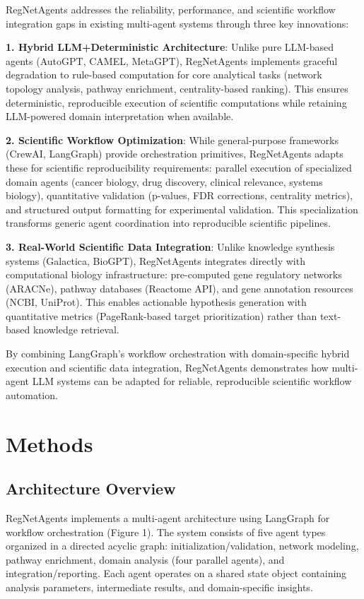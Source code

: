 \documentclass[11pt]{article}
\begin{document}
RegNetAgents addresses the reliability, performance, and scientific workflow integration gaps in existing multi-agent systems through three key innovations:

\textbf{1. Hybrid LLM+Deterministic Architecture}: Unlike pure LLM-based agents (AutoGPT, CAMEL, MetaGPT), RegNetAgents implements graceful degradation to rule-based computation for core analytical tasks (network topology analysis, pathway enrichment, centrality-based ranking). This ensures deterministic, reproducible execution of scientific computations while retaining LLM-powered domain interpretation when available.

\textbf{2. Scientific Workflow Optimization}: While general-purpose frameworks (CrewAI, LangGraph) provide orchestration primitives, RegNetAgents adapts these for scientific reproducibility requirements: parallel execution of specialized domain agents (cancer biology, drug discovery, clinical relevance, systems biology), quantitative validation (p-values, FDR corrections, centrality metrics), and structured output formatting for experimental validation. This specialization transforms generic agent coordination into reproducible scientific pipelines.

\textbf{3. Real-World Scientific Data Integration}: Unlike knowledge synthesis systems (Galactica, BioGPT), RegNetAgents integrates directly with computational biology infrastructure: pre-computed gene regulatory networks (ARACNe), pathway databases (Reactome API), and gene annotation resources (NCBI, UniProt). This enables actionable hypothesis generation with quantitative metrics (PageRank-based target prioritization) rather than text-based knowledge retrieval.

By combining LangGraph's workflow orchestration with domain-specific hybrid execution and scientific data integration, RegNetAgents demonstrates how multi-agent LLM systems can be adapted for reliable, reproducible scientific workflow automation.

\section{Methods}

\subsection{Architecture Overview}

RegNetAgents implements a multi-agent architecture using LangGraph for workflow orchestration (Figure 1). The system consists of five agent types organized in a directed acyclic graph: initialization/validation, network modeling, pathway enrichment, domain analysis (four parallel agents), and integration/reporting. Each agent operates on a shared state object containing analysis parameters, intermediate results, and domain-specific insights.
\end{document}

